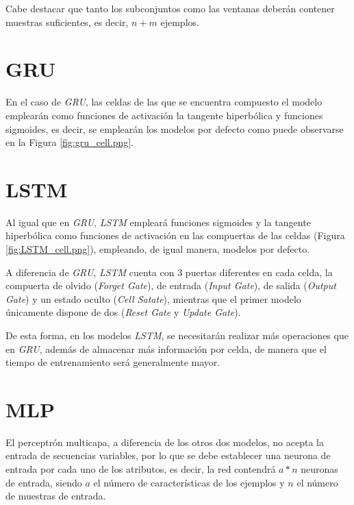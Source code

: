 Cabe destacar que tanto los subconjuntos como las ventanas deberán contener muestras 
suficientes, es decir, \(n + m\) ejemplos.

\newpage

\section{GRU}
En el caso de \textit{GRU}, las celdas de las que se encuentra compuesto el modelo 
emplearán como funciones de activación la tangente hiperbólica y funciones sigmoides, 
es decir, se emplearán los modelos por defecto como puede observarse en la Figura 
\ref{fig:gru_cell.png}.


\section{LSTM}
Al igual que en \textit{GRU}, \textit{LSTM} empleará funciones sigmoides y la 
tangente hiperbólica como funciones de activación en las compuertas de las celdas (Figura \ref{fig:LSTM_cell.png}),
empleando, de igual manera, modelos por defecto.


A diferencia de \textit{GRU}, \textit{LSTM} cuenta con 3 puertas diferentes en cada celda, 
la compuerta de olvido (\textit{Forget Gate}), de entrada (\textit{Input Gate}), 
de salida (\textit{Output Gate}) y un estado oculto (\textit{Cell Satate}), mientras que 
el primer modelo únicamente dispone de dos (\textit{Reset Gate} y \textit{Update Gate}).

De esta forma, en los modelos \textit{LSTM}, se necesitarán realizar más operaciones
que en \textit{GRU}, además de almacenar más información por celda, 
de manera que el tiempo de entrenamiento será generalmente mayor.

\section{MLP}
El perceptrón multicapa, a diferencia de los otros dos modelos, no acepta
la entrada de secuencias variables, por lo que se debe establecer una neurona de entrada
por cada uno de los atributos, es decir, la red contendrá
\(a * n\) neuronas de entrada, siendo \(a\) el número de características de los ejemplos y
\(n\) el número de muestras de entrada.

